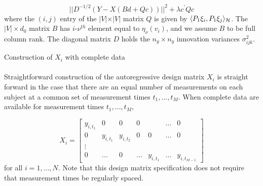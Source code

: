 \begin{equation} \label{eq:ar-design-matrix-1}
\vert \vert D^{-1/2}\left( Y - X \left( Bd + Qc \right) \right) \vert \vert^2  + \lambda c^\prime Q c 
\end{equation}
\noindent
where the $\left(i,j\right)$ entry of the $\vert V \vert \times \vert V \vert$ matrix $Q$ is given by $\langle P_1 \xi_i,  P_1 \xi_j \rangle_{\mathcal{H}}$. The $\vert V \vert \times d_0$ matrix $B$ has $i$-$\nu^{th}$ element equal to $\eta_\nu\left(v_i\right)$, and we assume $B$ to be full column rank.  The diagonal matrix $D$ holds the $n_y \times n_y$  innovation variances $\sigma^2_{ijk}$. 

\bigskip

\begin{example}{Construction of $X_i$ with complete data} \label{example:construction-of-X}
\\
\vspace{.5cm} 
\\
Straightforward construction of the autoregressive design matrix $X_i$ is straight forward in the case that there are an equal number of measurements on each subject at a common set of measurement times $t_1,\dots, t_M$. When complete data are available for measurement times $t_1, \dots, t_M$, 

\begin{equation}
X_i =  \begin{bmatrix} 
y_{i, t_1} & 0 & 0 &0&& \dots & 0 \\
 0 & y_{i, t_1} &  y_{i, t_2}&0 &0& \dots & 0 \\
 \vdots &&&&&&\\
 0 & \dots &0 & \dots& y_{i,t_1} & \dots &  y_{i, t_{M-1}}
\end{bmatrix}
\end{equation}
\noindent
for all $i = 1,\dots, N$. Note that this design matrix specification does not require that measurement times be regularly spaced.  
\end{example}

